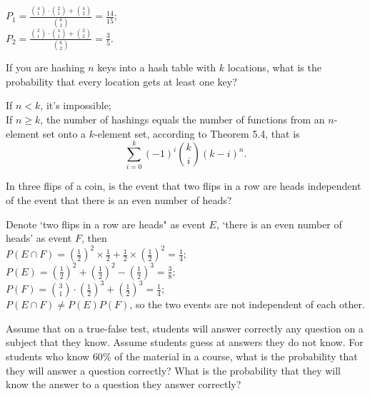 \documentclass[12pt, a4paper, UTF8]{ctexart}
\begin{document}

\begin{solution}
  $P_{1} = \frac{\binom{4}{1}\cdot\binom{2}{1} + \binom{4}{2}}{\binom{6}{2}} 
  = \frac{14}{15};$\\
  $P_{2} = \frac{\binom{2}{1}\cdot\binom{4}{1} + \binom{2}{2}}{\binom{6}{2}} 
  = \frac{3}{5}.$
\end{solution}

\begin{problem}[CS: 5.2.10]
  If you are hashing $n$ keys into a hash table with $k$ locations, what is 
  the probability that every location gets at least one key?
\end{problem}

\begin{solution}
  If $n < k$, it's impossible;\\
  If $n \geq k$, the number of hashings equals the number of functions from 
  an $n$-element set onto a $k$-element set, according to Theorem 5.4, that is
  \[ \sum_{i=0}^{k} (-1)^{i} \binom{k}{i} (k - i)^{n}. \]
\end{solution}

\begin{problem}[CS: 5.3.2]
  In three flips of a coin, is the event that two flips in a row are heads 
  independent of the event that there is an even number of heads?
\end{problem}

\begin{solution}
  Denote `two flips in a row are heads" as event $E$, `there is an even number 
  of heads' as event $F$, then\\
  $P(E \cap F) = (\frac{1}{2})^{2} \times \frac{1}{2} + \frac{1}{2} \times (\frac{1}{2})^{2} 
  = \frac{1}{4};$\\
  $P(E) = (\frac{1}{2})^{2} + (\frac{1}{2})^{2} - (\frac{1}{2})^{3} = \frac{3}{8};$\\
  $P(F) = \binom{3}{1} \cdot (\frac{1}{2})^{3} + (\frac{1}{2})^{3} = \frac{1}{4};$\\
  $P(E \cap F) \neq P(E)P(F)$, so the two events are not independent of each 
  other.
\end{solution}

\begin{problem}[CS: 5.3.6]
  Assume that on a true-false test, students will answer correctly any question 
  on a subject that they know. Assume students guess at answers they do not know. 
  For students who know $60\%$ of the material in a course, what is the 
  probability that they will answer a question correctly? What is the probability 
  that they will know the answer to a question they answer correctly?
\end{problem}
\end{document}
